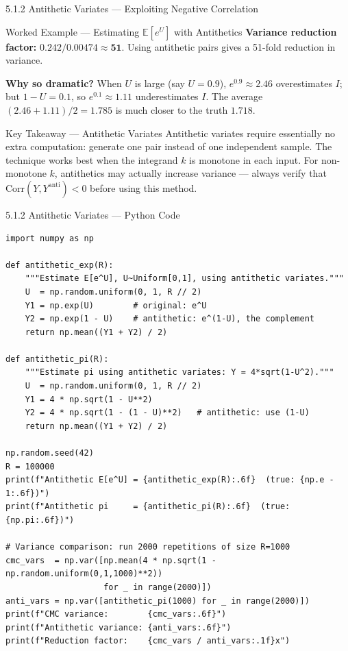 \documentclass[aspectratio=169,10pt]{beamer}
\begin{document}
\begin{frame}[allowframebreaks]{5.1.2 Antithetic Variates --- Exploiting Negative Correlation}
\begin{exampleblock}{Worked Example --- Estimating $\mathbb{E}[e^U]$ with Antithetics}
  \medskip
  \textbf{Variance reduction factor:} $0.242 / 0.00474 \approx \mathbf{51}$.
  Using antithetic pairs gives a 51-fold reduction in variance.

  \medskip
  \textbf{Why so dramatic?}  When $U$ is large (say $U = 0.9$), $e^{0.9} \approx 2.46$
  overestimates $I$; but $1 - U = 0.1$, so $e^{0.1} \approx 1.11$ underestimates $I$.
  The average $(2.46 + 1.11)/2 = 1.785$ is much closer to the truth $1.718$.
\end{exampleblock}

\begin{alertblock}{Key Takeaway --- Antithetic Variates}
  Antithetic variates require essentially no extra computation: generate
  one pair instead of one independent sample.  The technique works best when
  the integrand $k$ is monotone in each input.  For non-monotone $k$,
  antithetics may actually increase variance --- always verify that
  $\mathrm{Corr}(Y, Y^{\mathrm{anti}}) < 0$ before using this method.
\end{alertblock}

\end{frame}

\begin{frame}[fragile]{5.1.2 Antithetic Variates --- Python Code}
\begin{lstlisting}[style=python]
import numpy as np

def antithetic_exp(R):
    """Estimate E[e^U], U~Uniform[0,1], using antithetic variates."""
    U  = np.random.uniform(0, 1, R // 2)
    Y1 = np.exp(U)        # original: e^U
    Y2 = np.exp(1 - U)    # antithetic: e^(1-U), the complement
    return np.mean((Y1 + Y2) / 2)

def antithetic_pi(R):
    """Estimate pi using antithetic variates: Y = 4*sqrt(1-U^2)."""
    U  = np.random.uniform(0, 1, R // 2)
    Y1 = 4 * np.sqrt(1 - U**2)
    Y2 = 4 * np.sqrt(1 - (1 - U)**2)   # antithetic: use (1-U)
    return np.mean((Y1 + Y2) / 2)

np.random.seed(42)
R = 100000
print(f"Antithetic E[e^U] = {antithetic_exp(R):.6f}  (true: {np.e - 1:.6f})")
print(f"Antithetic pi     = {antithetic_pi(R):.6f}  (true: {np.pi:.6f})")

# Variance comparison: run 2000 repetitions of size R=1000
cmc_vars  = np.var([np.mean(4 * np.sqrt(1 - np.random.uniform(0,1,1000)**2))
                    for _ in range(2000)])
anti_vars = np.var([antithetic_pi(1000) for _ in range(2000)])
print(f"CMC variance:        {cmc_vars:.6f}")
print(f"Antithetic variance: {anti_vars:.6f}")
print(f"Reduction factor:    {cmc_vars / anti_vars:.1f}x")
\end{lstlisting}
\end{frame}
\end{document}
